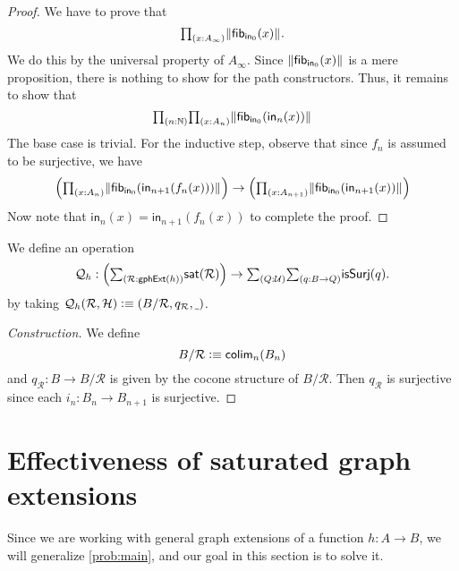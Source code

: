 \begin{proof}
We have to prove that
\begin{equation*}
\prd{x:A_\infty} \brck{\fib{\mathsf{in}_0}{x}}.
\end{equation*}
We do this by the universal property of $A_\infty$. Since $\Vert \mathsf{fib}_{\mathsf{in}_0}(x)\Vert_{}$ is a mere proposition, there is nothing to show for the path constructors. Thus, it remains to show that
\begin{equation*}
\prd{n:\N}{x:A_n} \brck{\fib{\mathsf{in}_0}{\mathsf{in}_n(x)}}
\end{equation*}
The base case is trivial. For the inductive step, observe that since $f_n$ is assumed to be surjective, we have
\begin{equation*}
\Big(\prd{x:A_{n}} \brck{\fib{\mathsf{in}_0}{\mathsf{in}_{n+1}(f_n(x))}}\Big)\to\Big(\prd{x:A_{n+1}} \brck{\fib{\mathsf{in}_0}{\mathsf{in}_{n+1}(x)}}\Big)
\end{equation*}
Now note that $\mathsf{in}_{n}(x)=\mathsf{in}_{n+1}(f_n(x))$ to complete the proof.
\end{proof}

\begin{defn}
We define an operation
\begin{equation*}
\mathcal{Q}_h : \Big(\sm{\mathcal{R}:\mathsf{gphExt}(h)}\mathsf{sat}(\mathcal{R})\Big)\to \sm{Q:\UU}{q:B\to Q}\mathsf{isSurj}(q).
\end{equation*}
by taking $\mathcal{Q}_h(\mathcal{R},\mathcal{H})\vcentcolon\equiv{\mathopen{}(B/\mathcal{R},q_\mathcal{R},\underline{~})\mathclose{}}$.
\end{defn}

\begin{proof}[Construction]
We define
\begin{equation*}
B/\mathcal{R}\vcentcolon\equiv \mathsf{colim}_n(B_n)
\end{equation*}
and $q_\mathcal{R}:B\to B/\mathcal{R}$ is given by the cocone structure of $B/\mathcal{R}$. Then $q_{\mathcal{R}}$ is surjective since each $i_n:B_n\to B_{n+1}$ is surjective.
\end{proof}

\section{Effectiveness of saturated graph extensions}

Since we are working with general graph extensions of a function $h:A\to B$, we will generalize \autoref{prob:main}, and our goal in this section is to solve it.

